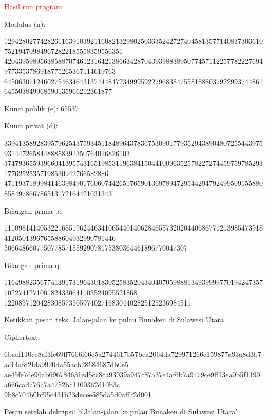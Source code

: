 \documentclass{article}
\begin{document}

\textcolor{red}{\Huge Hasil run program:}

Modulus (n):

129428027742826116391039211608213298025036352427274045813577140837303610752194709849672822185558359556351
4204395989563858870746123164213866342870439398838950774571122577822276949773353786918775265367114619763
645063071246027546346431374448472349995922796838475581888037922993744861645503849968590135966212361877

Kunci publik (e): 65537

Kunci privat (d):

33941358928395796254375934511848964378367530901779352943890480725544397593144726584488858392350764026826103
37479365593966041395743165198531196384150441009635257822727445975978529317762525357198530942766582886
471193718998414639849017606074426517659013697894729544294792499509155880858497866786513172164421031343

Bilangan prima p:

1110981414053221655196244634106544014062846557320204406867712139854739184120501396765588604932990781446
506648660775077857155929078175380364461896770047307

Bilangan prima q:

1164988235677413917319643018305258352043404070598881349399997701942473577022741271001824330641103524095521868
1220857120428308573505974027168304402825125236984511

Ketikkan pesan teks: Jalan-jalan ke pulau Bunaken di Sulawesi Utara

Ciphertext:

6baef110cc8af3fe69ff7606f66e5a2744617b57bca2064da729971266c159877a93a8d3b7ac14afd2fda9920da55acb28684687db0e5
ae45fe7de96ab696784631ed5cc8ca93039a947c87a37e4af6b7a9479ce9ff13ea0b5f1190a666cad77677a4752bc1100362d10b3c
9b8c704b0bf95c431b23decee585da5d0aff72d001

Pesan setelah dekripsi: b'Jalan-jalan ke pulau Bunaken di Sulawesi Utara'
\end{document}
